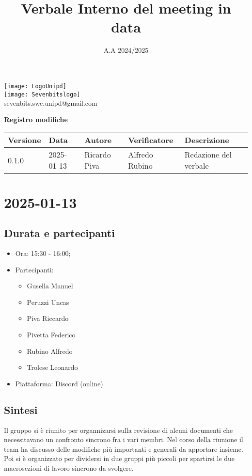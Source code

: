 \documentclass[10pt]{article}
\title{Verbale Interno del meeting in data}
\date{A.A 2024/2025}
\begin{document}
\maketitle
\begin{center}
\texttt{[image: LogoUnipd]}\\
\texttt{[image: Sevenbitslogo]}\\
sevenbits.swe.unipd@gmail.com\\
\vspace{2mm}

\textbf{Registro modifiche}\\
\vspace{2mm}
\begin{tabularx}{\textwidth}{|l|l|l|l|X|}
\hline
\textbf{Versione} & \textbf{Data} & \textbf{Autore} & \textbf{Verificatore} & \textbf{Descrizione} \\
\hline
0.1.0 & 2025-01-13 & Ricardo Piva & Alfredo Rubino & Redazione del verbale \\
\hline
\end{tabularx}
\end{center}

\newpage
\tableofcontents
\newpage
\section{2025-01-13}
\subsection{Durata e partecipanti}
\begin{itemize}
\item Ora: 15:30 - 16:00;
\item Partecipanti: 	
	\begin{itemize}
		\item Gusella Manuel
		\item Peruzzi Uncas
		\item Piva Riccardo
		\item Pivetta Federico
		\item Rubino Alfredo
		\item Trolese Leonardo
	\end{itemize}
\item Piattaforma: Discord (online)
\end{itemize}

\subsection{Sintesi}
Il gruppo si è riunito per organnizarsi sulla revisione di alcuni documenti che necessitavano un confronto sincrono fra i vari membri.
Nel corso della riunione il team ha discusso delle modifiche più importanti e generali da apportare insieme. Poi si è organizzato per dividersi
in due gruppi più piccoli per spartirsi le due macrosezioni di lavoro sincrono da svolgere.
\end{document}
